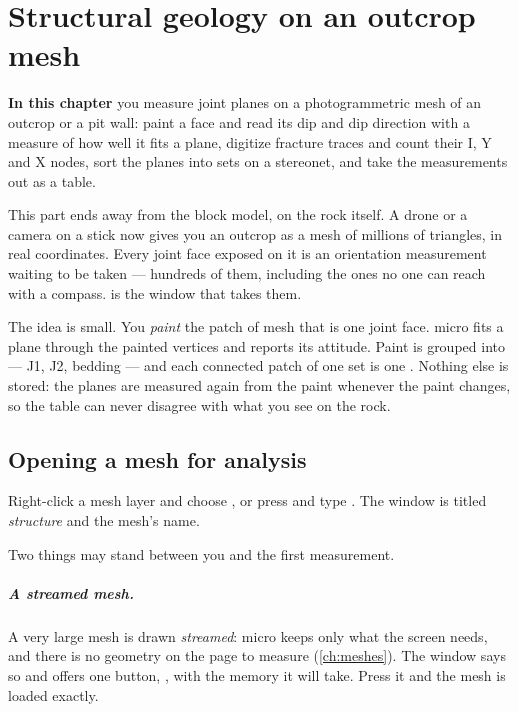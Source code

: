 \chapter{Structural geology on an outcrop mesh}\label{ch:structure}
\begin{goals}
\textbf{In this chapter} you measure joint planes on a photogrammetric mesh of an outcrop or a pit wall: paint a face and read its dip and dip direction with a measure of how well it fits a plane, digitize fracture traces and count their I, Y and X nodes, sort the planes into sets on a stereonet, and take the measurements out as a table.
\end{goals}

This part ends away from the block model, on the rock itself. A drone or a camera on a stick now gives you an outcrop as a mesh of millions of triangles, in real coordinates. Every joint face exposed on it is an orientation measurement waiting to be taken — hundreds of them, including the ones no one can reach with a compass.  is the window that takes them.

The idea is small. You \emph{paint} the patch of mesh that is one joint face. micro fits a plane through the painted vertices and reports its attitude. Paint is grouped into  — J1, J2, bedding — and each connected patch of one set is one . Nothing else is stored: the planes are measured again from the paint whenever the paint changes, so the table can never disagree with what you see on the rock.

\section{Opening a mesh for analysis}\label{sec:structure-open}

Right-click a mesh layer and choose , or press  and type . The window is titled \emph{structure} and the mesh's name.

Two things may stand between you and the first measurement.

\paragraph{A streamed mesh.} A very large mesh is drawn \emph{streamed}: micro keeps only what the screen needs, and there is no geometry on the page to measure (\cref{ch:meshes}). The window says so and offers one button, , with the memory it will take. Press it and the mesh is loaded exactly.

